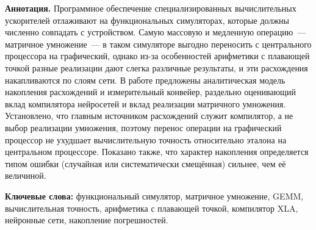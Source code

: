 \begin{center}
\begin{minipage}{0.92\textwidth}
\small
\textbf{Аннотация.}
Программное обеспечение специализированных вычислительных ускорителей отлаживают
на функциональных симуляторах, которые должны численно совпадать с устройством.
Самую массовую и медленную операцию~--- матричное умножение~--- в таком
симуляторе выгодно переносить с центрального процессора на графический, однако
из-за особенностей арифметики с плавающей точкой разные реализации дают слегка
различные результаты, и эти расхождения накапливаются по слоям сети. В работе
предложены аналитическая модель накопления расхождений и измерительный конвейер,
раздельно оценивающий вклад компилятора нейросетей и вклад реализации матричного
умножения. Установлено, что главным источником расхождений служит компилятор, а
не выбор реализации умножения, поэтому перенос операции на графический процессор
не ухудшает вычислительную точность относительно эталона на центральном
процессоре. Показано также, что характер накопления определяется типом ошибки
(случайная или систематически смещённая) сильнее, чем её величиной.

\smallskip
\textbf{Ключевые слова:} функциональный симулятор, матричное умножение, GEMM,
вычислительная точность, арифметика с плавающей точкой, компилятор XLA,
нейронные сети, накопление погрешностей.
\end{minipage}
\end{center}

\vspace{0.5em}
